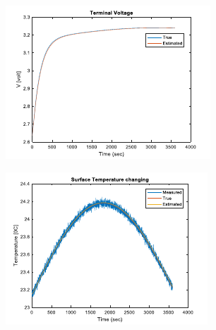 \documentclass[12pt]{article}
\begin{document}
\begin{figure}[H]
	\centering
	\begin{subfigure}[t]{0.3\linewidth}
		\includegraphics[width=\linewidth]{figures/estTempPar1.pdf}
	\end{subfigure}
	\begin{subfigure}[t]{0.3\linewidth}
		\includegraphics[width=\linewidth]{figures/estTempPar2.pdf}
	\end{subfigure}	
	\begin{subfigure}[t]{0.3\linewidth}

\end{subfigure}
\end{figure}
\end{document}
